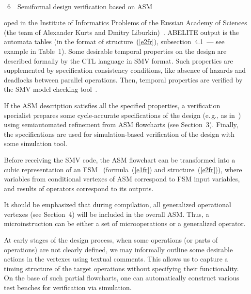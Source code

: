 \begin{multicols}{2}
\begin{center} %
\vspace*{6pt}
\mbox{%
\epsfxsize=79.0969mm
}
\end{center}
\vspace*{-6pt}
\begin{center}
{{\figurename~6}\ \ \small{Semiformal design verification based on ASM}}
\end{center}

\bigskip
\addtocounter{figure}{1}

\noindent
oped in the Institute of 
Informatics Problems of the Russian Academy of Sciences (the team of Alexander Kurts and 
Dmitry Liburkin)~\cite{14fr}. ABELITE output is the automata tables (in the format of 
structure~(\ref{e2fr}), subsection~4.1~--- see example in Table~1). Some desirable 
temporal properties on the design are described formally by the CTL language in SMV format. 
Such properties are supplemented by specification consistency conditions, like absence of hazards 
and deadlocks between parallel operations. Then, temporal properties are verified by the SMV 
model checking tool~\cite{6fr}.
   
   If the ASM description satisfies all the specified properties, a verification specialist prepares 
some cycle-accurate specifications of the design (e.\,g., as in~\cite{10fr}) using semiautomated 
refinement from ASM flowcharts (see Section~3). Finally, the specifications are used for 
simulation-based verification of the design with some simulation tool.

Before receiving the SMV code, the ASM flowchart can be transformed into a cubic 
representation of an FSM~\cite{2fr} (formula~(\ref{e1fr}) and structure~(\ref{e2fr})), where 
variables from conditional vertexes of ASM correspond to FSM input variables, and results of 
operators correspond to its outputs. 
   
   It should be emphasized that during compilation, all generalized operational vertexes 
(see Section~4) will be included in the overall ASM. Thus, a microinstruction can be either a set of 
microoperations or a generalized operator.
   
   At early stages of the design process, when some operations (or parts of operations) are not 
clearly defined, we may informally outline some desirable actions in the vertexes using textual 
comments. This allows us to capture a timing structure of the target operations without specifying 
their functionality. On the base of such partial flowcharts, one can automatically construct various 
test benches for verification via simulation. 


\end{multicols}

